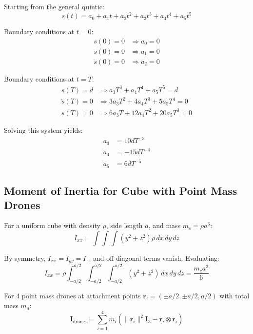 \documentclass[12pt,a4paper]{article}
\begin{document}
Starting from the general quintic:
\begin{equation}
    s(t) = a_0 + a_1 t + a_2 t^2 + a_3 t^3 + a_4 t^4 + a_5 t^5
\end{equation}

Boundary conditions at $t=0$:
\begin{align}
    s(0) = 0 &\Rightarrow a_0 = 0 \\
    \dot{s}(0) = 0 &\Rightarrow a_1 = 0 \\
    \ddot{s}(0) = 0 &\Rightarrow a_2 = 0
\end{align}

Boundary conditions at $t=T$:
\begin{align}
    s(T) = d &\Rightarrow a_3 T^3 + a_4 T^4 + a_5 T^5 = d \\
    \dot{s}(T) = 0 &\Rightarrow 3a_3 T^2 + 4a_4 T^3 + 5a_5 T^4 = 0 \\
    \ddot{s}(T) = 0 &\Rightarrow 6a_3 T + 12a_4 T^2 + 20a_5 T^3 = 0
\end{align}

Solving this system yields:
\begin{align}
    a_3 &= 10dT^{-3} \\
    a_4 &= -15dT^{-4} \\
    a_5 &= 6dT^{-5}
\end{align}

\subsection{Moment of Inertia for Cube with Point Mass Drones}

For a uniform cube with density $\rho$, side length $a$, and mass $m_c = \rho a^3$:
\begin{equation}
    I_{xx} = \int\int\int (y^2 + z^2) \rho \, dx\,dy\,dz
\end{equation}

By symmetry, $I_{xx} = I_{yy} = I_{zz}$ and off-diagonal terms vanish. Evaluating:
\begin{equation}
    I_{xx} = \rho \int_{-a/2}^{a/2} \int_{-a/2}^{a/2} \int_{-a/2}^{a/2} (y^2 + z^2) \, dx\,dy\,dz = \frac{m_c a^2}{6}
\end{equation}

For 4 point mass drones at attachment points $\mathbf{r}_i = (\pm a/2, \pm a/2, a/2)$ with total mass $m_d$:
\begin{equation}
    \mathbf{I}_{\text{drones}} = \sum_{i=1}^{4} m_i \left( \|\mathbf{r}_i\|^2 \mathbf{I}_3 - \mathbf{r}_i \otimes \mathbf{r}_i \right)
\end{equation}
\end{document}
